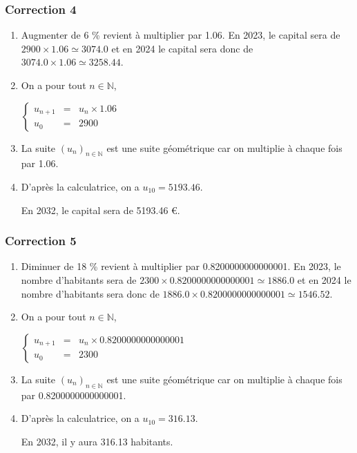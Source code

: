 \documentclass[15pt, mathserif]{beamer}
\newcommand{\N}{\mathbb{N}}			%
\newcommand{\st}[1]{$(#1_n)_{n \in \N}$}
\begin{document}
\begin{frame}
\vspace{-10mm}
	\frametitle{Correction 4}
\begin{enumerate} 
 	 \item Augmenter de 6 \% revient à multiplier par  1.06. En 2023, le capital sera de $2900 \times  1.06\simeq 3074.0$ et en 2024 le capital sera donc de  $3074.0 \times  1.06\simeq 3258.44$.  
 	 \item On a pour tout $n \in \N$, 
 
 \hfil$\left\{\begin{array}{rcl} 
 u_{n+1} & = & u_n \times  1.06\\ u_0 & = &  2900\end{array} \right.$ 
 	 \item La suite \st{u} est une suite géométrique car on multiplie à chaque fois par  1.06. 
 	 \item D'après la calculatrice, on a $u_{10}=5193.46$. 
 
 En 2032, le capital sera de 5193.46 \euro. 
 \end{enumerate} 
 
 \end{frame}


\begin{frame}
\vspace{-10mm}
	\frametitle{Correction 5}
\begin{enumerate} 
 	 \item Diminuer de 18 \% revient à multiplier par  0.8200000000000001. En 2023, le nombre d'habitants sera de $2300 \times  0.8200000000000001\simeq 1886.0$ et en 2024 le nombre d'habitants sera donc de  $1886.0 \times  0.8200000000000001\simeq 1546.52$.  
 	 \item On a pour tout $n \in \N$, 
 
 \hfil$\left\{\begin{array}{rcl} 
 u_{n+1} & = & u_n \times  0.8200000000000001\\ u_0 & = &  2300\end{array} \right.$ 
 	 \item La suite \st{u} est une suite géométrique car on multiplie à chaque fois par  0.8200000000000001. 
 	 \item D'après la calculatrice, on a $u_{10}=316.13$. 
 
 En 2032, il y aura 316.13 habitants. 
 \end{enumerate} 
 
 \end{frame}
\end{document}
